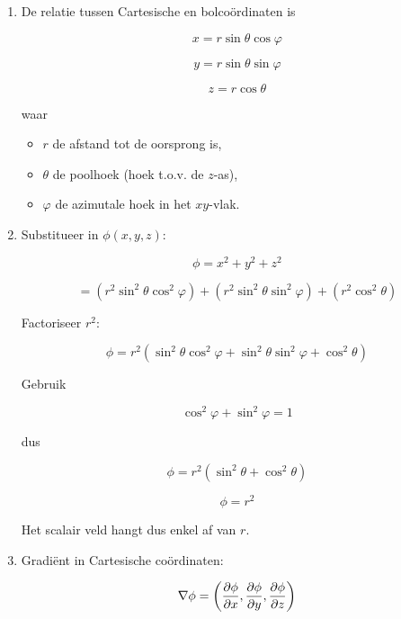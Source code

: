 \documentclass[11pt,a4paper]{article}
\begin{document}
    \begin{enumerate}

        \item De relatie tussen Cartesische en bolcoördinaten is

        \[
            x = r\sin\theta\cos\varphi
        \]

        \[
            y = r\sin\theta\sin\varphi
        \]

        \[
            z = r\cos\theta
        \]

        waar

        \begin{itemize}
            \item \(r\) de afstand tot de oorsprong is,
            \item \(\theta\) de poolhoek (hoek t.o.v. de \(z\)-as),
            \item \(\varphi\) de azimutale hoek in het \(xy\)-vlak.
        \end{itemize}

        \item Substitueer in \(\phi(x,y,z)\):

        \[
            \phi = x^2 + y^2 + z^2
        \]

        \[
            = (r^2\sin^2\theta\cos^2\varphi)
            + (r^2\sin^2\theta\sin^2\varphi)
            + (r^2\cos^2\theta)
        \]

        Factoriseer \(r^2\):

        \[
            \phi = r^2(\sin^2\theta\cos^2\varphi
            + \sin^2\theta\sin^2\varphi
            + \cos^2\theta)
        \]

        Gebruik

        \[
            \cos^2\varphi + \sin^2\varphi = 1
        \]

        dus

        \[
            \phi = r^2(\sin^2\theta + \cos^2\theta)
        \]

        \[
            \phi = r^2
        \]

        Het scalair veld hangt dus enkel af van \(r\).

        \item Gradiënt in Cartesische coördinaten:

        \[
            \nabla\phi =
            \left(
                \pdv{\phi}{x},
                \pdv{\phi}{y},
                \pdv{\phi}{z}
            \right)
        \]


\end{enumerate}
\end{document}
